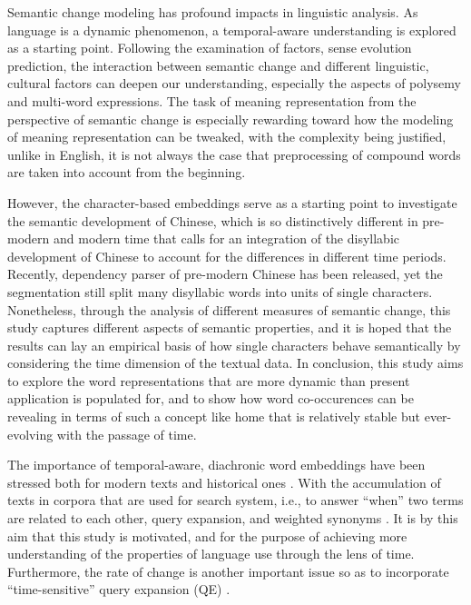 Semantic change modeling has profound impacts in linguistic analysis. As language is a dynamic phenomenon, a temporal-aware understanding is explored as a starting point. Following the examination of factors, sense evolution prediction, the interaction between semantic change and different linguistic, cultural factors can deepen our understanding, especially the aspects of polysemy and multi-word expressions. The task of meaning representation from the perspective of semantic change is especially rewarding toward how the modeling of meaning representation can be tweaked, with the complexity being justified, unlike in English, it is not always the case that preprocessing of compound words are taken into account from the beginning.

However, the character-based embeddings serve as a starting point to investigate the semantic development of Chinese, which is so distinctively different in pre-modern and modern time that calls for an integration of the disyllabic development of Chinese to account for the differences in different time periods. Recently, dependency parser of pre-modern Chinese has been released, yet the segmentation still split many disyllabic words into units of single characters. Nonetheless, through the analysis of different measures of semantic change, this study captures different aspects of semantic properties, and it is hoped that the results can lay an empirical basis of how single characters behave semantically by considering the time dimension of the textual data. In conclusion, this study aims to explore the word representations that are more dynamic than present application is populated for, and to show how word co-occurences can be revealing in terms of such a concept like home that is relatively stable but ever-evolving with the passage of time.

The importance of temporal-aware, diachronic word embeddings have been stressed both for modern texts and historical ones \parencite{huang2019neural,rosin2017learning,ruder2017word}. With the accumulation of texts in corpora that are used for search system, i.e., to answer ``when'' two terms are related to each other, query expansion, and weighted synonyms \parencite{rosin2017learning}. It is by this aim that this study is motivated, and for the purpose of achieving more understanding of the properties of language use through the lens of time. Furthermore, the rate of change is another important issue so as to incorporate ``time-sensitive'' query expansion (QE) \parencite{rosin2017learning}.

